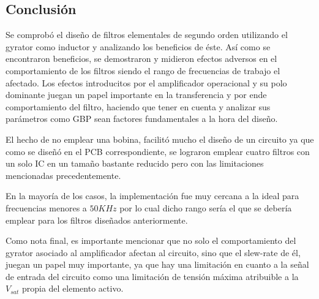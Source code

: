 \subsection{Conclusión}

Se comprobó el diseño de filtros elementales de segundo orden utilizando el gyrator como inductor y analizando los beneficios de éste.
Así como se encontraron beneficios, se demostraron y midieron efectos adversos en el comportamiento de los filtros siendo el rango de frecuencias
de trabajo el afectado. Los efectos introducitos por el amplificador operacional y su polo dominante juegan un papel importante en la transferencia
y por ende comportamiento del filtro, haciendo que tener en cuenta y analizar sus parámetros como GBP sean factores fundamentales a la hora del diseño.


El hecho de no emplear una bobina, facilitó mucho el diseño de un circuito ya que como se diseñó en el PCB correspondiente, se lograron emplear
cuatro filtros con un solo IC en un tamaño bastante reducido pero con las limitaciones mencionadas precedentemente.

En la mayoría de los casos, la implementación fue muy cercana a la ideal para frecuencias menores a $50KHz$ por lo cual dicho rango
sería el que se debería emplear para los filtros diseñados anteriormente. 

Como nota final, es importante mencionar que no solo el comportamiento del gyrator asociado al amplificador afectan al circuito, sino que
el slew-rate de él, juegan un papel muy importante, ya que hay una limitación en cuanto a la señal de entrada del circuito como una limitación de tensión máxima
atribuible a la $V_{sat}$ propia del elemento activo.